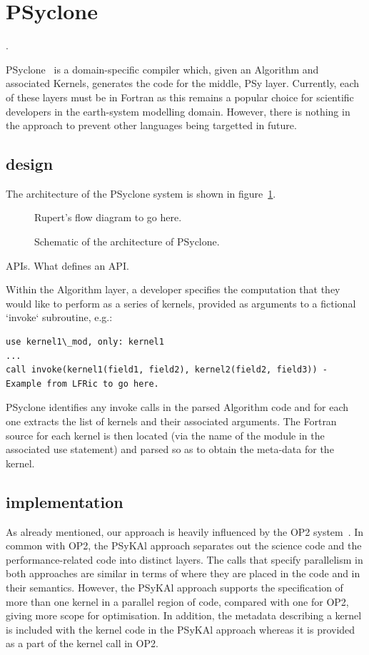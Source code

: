 \documentclass[times]{elsarticle}
\begin{document}
\section{\label{sec:psyclone}PSyclone}.

PSyclone~\cite{psyclone} is a domain-specific compiler which, given an
Algorithm and associated Kernels, generates the code for the middle, PSy
layer. Currently, each of these layers must be in Fortran as this
remains a popular choice for scientific developers in the earth-system
modelling domain. However, there is nothing in the approach to prevent
other languages being targetted in future.

\subsection{design}

The architecture of the PSyclone system is shown in
figure~\ref{fig:psyclone-arch}.

\begin{figure}
Rupert's flow diagram to go here.
\caption{\label{fig:psyclone-arch}Schematic of the architecture of PSyclone.}
\end{figure}

APIs. What defines an API.

Within the Algorithm layer, a developer specifies the computation that they
would like to perform as a series of kernels, provided as arguments to a
fictional `invoke` subroutine, e.g.:

\begin{verbatim}
use kernel1\_mod, only: kernel1
...
call invoke(kernel1(field1, field2), kernel2(field2, field3)) - Example from LFRic to go here.
\end{verbatim}

PSyclone identifies any invoke calls in the parsed Algorithm code and
for each one extracts the list of kernels and their associated
arguments.  The Fortran source for each kernel is then located (via
the name of the module in the associated use statement) and parsed so as
to obtain the meta-data for the kernel.


\subsection{implementation}


As already mentioned, our approach is heavily influenced by the OP2
system~\citep{OP2, PYOP2}.
In common with OP2, the {PS}y{KA}l approach separates out the science
code and the performance-related code into distinct layers. The calls
that specify parallelism in both approaches are similar in terms of
where they are placed in the code and in their semantics. However, the
{PS}y{KA}l approach supports the specification of more than one kernel
in a parallel region of code, compared with one for OP2, giving more
scope for optimisation. In addition, the metadata describing a kernel
is included with the kernel code in the {PS}y{KA}l approach whereas it
is provided as a part of the kernel call in OP2.
\end{document}
